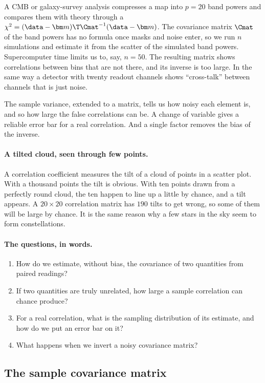 A CMB or galaxy-survey analysis compresses a map into $p=20$ band powers and
compares them with theory through a $\chi^2=(\data-\bm m)\T\Cmat^{-1}(\data-\bm m)$.
The covariance matrix $\Cmat$ of the band powers has no formula once masks
and noise enter, so we run $n$ simulations and estimate it from the scatter
of the simulated band powers. Supercomputer time limits us to, say, $n=50$.
The resulting matrix shows correlations between bins that are not there,
and its inverse is too large. In the same way a detector with twenty
readout channels shows ``cross-talk'' between channels that is just noise.

The sample variance, extended to a matrix, tells us how noisy each element
is, and so how large the false correlations can be. A change of variable
gives a reliable error bar for a real correlation. And a single factor
removes the bias of the inverse.

\paragraph{A tilted cloud, seen through few points.}
A correlation coefficient measures the tilt of a cloud of points in a
scatter plot. With a thousand points the tilt is obvious. With ten points
drawn from a perfectly round cloud, the ten happen to line up a little by
chance, and a tilt appears. A $20\times20$ correlation matrix has $190$
tilts to get wrong, so some of them will be large by chance. It is the same
reason why a few stars in the sky seem to form constellations.

\paragraph{The questions, in words.}
\begin{enumerate}[label=\arabic*.]
  \item How do we estimate, without bias, the covariance of two quantities
        from paired readings?
  \item If two quantities are truly unrelated, how large a sample
        correlation can chance produce?
  \item For a real correlation, what is the sampling distribution of its
        estimate, and how do we put an error bar on it?
  \item What happens when we invert a noisy covariance matrix?
\end{enumerate}

\subsection{The sample covariance matrix}
\label{3a:sec:sample-cov}

